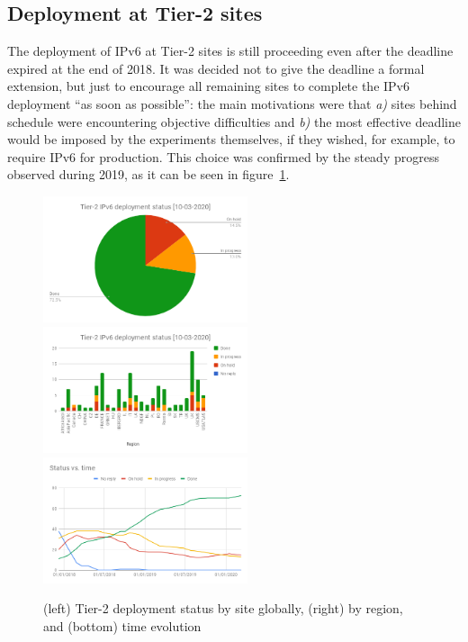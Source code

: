 \subsection{Deployment at Tier-2 sites}
The deployment of IPv6 at Tier-2 sites is still proceeding even after the
deadline expired at the end of 2018. It was decided not to
give the deadline a formal extension, but just to encourage all
remaining sites to complete the IPv6 deployment ``as soon as
possible'': the main motivations were that \emph{a)} sites behind
schedule were encountering objective difficulties and \emph{b)} the
most effective deadline would be imposed by the experiments
themselves, if they wished, for example, to require IPv6 for
production. This choice was confirmed by the steady progress observed
during 2019, as it can be seen in figure~\ref{fig:t2depl}.
\begin{figure}[h]
\centering
\includegraphics[width=6cm]{chart2}
\includegraphics[width=6cm]{chart}
\includegraphics[width=6cm]{chart3}
\caption{(left) Tier-2 deployment status by site globally, (right) by region, and (bottom) time evolution}
\label{fig:t2depl}
\end{figure}

